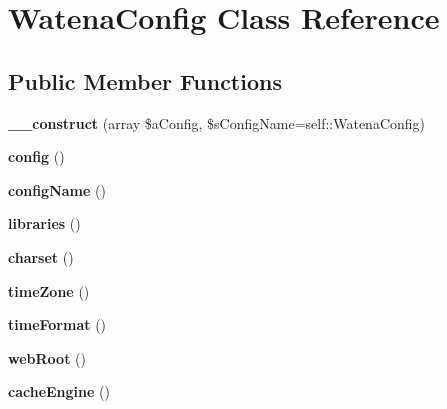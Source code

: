 \hypertarget{class_watena_config}{\section{Watena\-Config Class Reference}
\label{class_watena_config}
}
\subsection*{Public Member Functions}
\begin{DoxyCompactItemize}
\item 
\hypertarget{class_watena_config_a3253f9f5c2b9bdd1976119dc5ce886e7}{{\bfseries \-\_\-\-\_\-construct} (array \$a\-Config, \$s\-Config\-Name=self\-::\-Watena\-Config)}\label{class_watena_config_a3253f9f5c2b9bdd1976119dc5ce886e7}

\item 
\hypertarget{class_watena_config_aad534a794c11d454f3cbcb517dac26bf}{{\bfseries config} ()}\label{class_watena_config_aad534a794c11d454f3cbcb517dac26bf}

\item 
\hypertarget{class_watena_config_a3528ebc5470e20a48c05074b851b7179}{{\bfseries config\-Name} ()}\label{class_watena_config_a3528ebc5470e20a48c05074b851b7179}

\item 
\hypertarget{class_watena_config_acd9a0e1da5620cd947ea454a0554b544}{{\bfseries libraries} ()}\label{class_watena_config_acd9a0e1da5620cd947ea454a0554b544}

\item 
\hypertarget{class_watena_config_a3827a0d2cfd9a2698c56d2978400e53f}{{\bfseries charset} ()}\label{class_watena_config_a3827a0d2cfd9a2698c56d2978400e53f}

\item 
\hypertarget{class_watena_config_a66cead017ea6e52cfba195724f4409c9}{{\bfseries time\-Zone} ()}\label{class_watena_config_a66cead017ea6e52cfba195724f4409c9}

\item 
\hypertarget{class_watena_config_a3987bdefde99eb12b76dc142f8c98034}{{\bfseries time\-Format} ()}\label{class_watena_config_a3987bdefde99eb12b76dc142f8c98034}

\item 
\hypertarget{class_watena_config_a5cf65ccb19ca3b6b3d617ad79d4e66d2}{{\bfseries web\-Root} ()}\label{class_watena_config_a5cf65ccb19ca3b6b3d617ad79d4e66d2}

\item 
\hypertarget{class_watena_config_abe32b44f6b8c03e7557e4d2b9e8841f1}{{\bfseries cache\-Engine} ()}\label{class_watena_config_abe32b44f6b8c03e7557e4d2b9e8841f1}


\end{DoxyCompactItemize}
